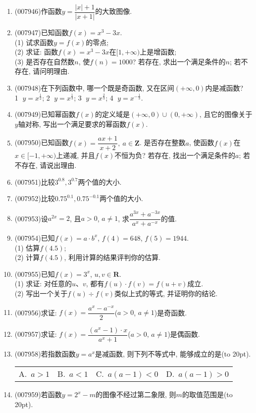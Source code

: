 \documentclass[10pt,a4paper]{article}
\newcommand{\bracket}[1]{(\hbox to #1pt{})}
\newcommand{\fourch}[4]{\par\begin{tabular}{p{.23\textwidth}p{.23\textwidth}p{.23\textwidth}p{.23\textwidth}}
A.~#1 &B.~#2& C.~#3& D.~#4
\end{tabular}}
\begin{document}
\begin{enumerate}[1.]
\item {\tiny (007946)}作函数$y=\dfrac{|x|+1}{|x+1|}$的大致图像.
\item {\tiny (007947)}已知函数$f(x)=x^3-3x$.\\
(1) 试求函数$y=f(x)$的零点;\\
(2) 求证: 函数$f(x)=x^3-3x$在$[1,+\infty)$上是增函数;\\
(3) 是否存在自然数$n$, 使$f(n)=1000$? 若存在, 求出一个满足条件的$n$; 若不存在, 请问明理由.
\item {\tiny (007948)}在下列函数中, 哪一个既是奇函数, 又在区间$(+\infty ,0)$内是减函数?\\ 
\textcircled{1} $y=x^{\frac 12}$; \textcircled{2} $y=x^{\frac 13}$; \textcircled{3} $y=x^{\frac 23}$; \textcircled{4} $y=x^{-\frac 13}$.
\item {\tiny (007949)}已知幂函数$f(x)$的定义域是$(+\infty ,0)\cup (0,+\infty)$, 且它的图像关于$y$轴对称, 写出一个满足要求的幂函数$f(x)$.
\item {\tiny (007950)}已知函数$f(x)=\dfrac{ax+1}{x+2},\ a\in \mathbf{Z}$. 是否存在整数$a$, 使函数$f(x)$在$x\in [-1,+\infty)$上递减, 并且$f(x)$不恒为负? 若存在, 找出一个满足条件的$a$; 若不存在, 请说出理由.
\item {\tiny (007951)}比较$3^{0.8},3^{0.7}$两个值的大小.
\item {\tiny (007952)}比较$0.75^{0.1},0.75^{-0.1}$两个值的大小.
\item {\tiny (007953)}设$a^{2x}=2$, 且$a>0$, $a\ne 1$, 求$\dfrac{a^{3x}+a^{-3x}}{a^x+a^{-x}}$的值.
\item {\tiny (007954)}已知$f(x)=a\cdot b^x$, $f(4)=648$, $f(5)=1944$.\\
(1) 估算$f(4.5)$;\\
(2) 计算$f(4.5)$, 利用计算的结果评判你的估算.
\item {\tiny (007955)}已知$f(x)=3^x$, $u,v\in \mathbf{R}$.\\
(1) 求证: 对任意的$u$、$v$, 都有$f(u)\cdot f(v)=f(u+v)$成立.\\
(2) 写出一个关于$f(u)\div f(v)$类似上式的等式, 并证明你的结论.
\item {\tiny (007956)}求证: $f(x)=\dfrac{a^x-a^{-x}}2$($a>0$, $a\ne 1$)是奇函数.
\item {\tiny (007957)}求证: $f(x)=\dfrac{(a^x-1)\cdot x}{a^x+1}$($a>0$, $a\ne 1$)是偶函数.
\item {\tiny (007958)}若指数函数$y=a^x$是减函数, 则下列不等式中, 能够成立的是\bracket{20}.
\fourch{$a>1$}{$a<1$}{$a(a-1)<0$}{$a(a-1)>0$}
\item {\tiny (007959)}若函数$y=2^x-m$的图像不经过第二象限, 则$m$的取值范围是\bracket{20}.

\end{enumerate}
\end{document}
